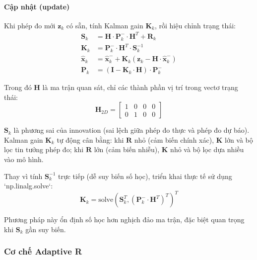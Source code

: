 \paragraph{Cập nhật (update)\\} Khi phép đo mới $\mathbf{z}_k$ có sẵn, tính Kalman gain $\mathbf{K}_k$, rồi hiệu chỉnh trạng thái:
\begin{equation}
\begin{aligned}
    \mathbf{S}_k &= \mathbf{H} \cdot \mathbf{P}_k^- \cdot \mathbf{H}^T + \mathbf{R}_k \\
    \mathbf{K}_k &= \mathbf{P}_k^- \cdot \mathbf{H}^T \cdot \mathbf{S}_k^{-1} \\
    \hat{\mathbf{x}}_k &= \hat{\mathbf{x}}_k^- + \mathbf{K}_k \left(\mathbf{z}_k - \mathbf{H} \cdot \hat{\mathbf{x}}_k^-\right) \\
    \mathbf{P}_k &= \left(\mathbf{I} - \mathbf{K}_k \cdot \mathbf{H}\right) \cdot \mathbf{P}_k^-
\end{aligned}
\end{equation}

Trong đó $\mathbf{H}$ là ma trận quan sát, chỉ các thành phần vị trí trong vectơ trạng thái:
\begin{equation}
    \mathbf{H}_{2D} = \begin{bmatrix} 1 & 0 & 0 & 0 \\ 0 & 1 & 0 & 0 \end{bmatrix}
\end{equation}

$\mathbf{S}_k$ là phương sai của innovation (sai lệch giữa phép đo thực và phép đo dự báo). Kalman gain $\mathbf{K}_k$ tự động cân bằng: khi $\mathbf{R}$ nhỏ (cảm biến chính xác), $\mathbf{K}$ lớn và bộ lọc tin tưởng phép đo; khi $\mathbf{R}$ lớn (cảm biến nhiễu), $\mathbf{K}$ nhỏ và bộ lọc dựa nhiều vào mô hình.

Thay vì tính $\mathbf{S}_k^{-1}$ trực tiếp (dễ suy biến số học), triển khai thực tế sử dụng `np.linalg.solve`:
\begin{equation}
    \mathbf{K}_k = \text{solve}\left(\mathbf{S}_k^T, \left(\mathbf{P}_k^- \cdot \mathbf{H}^T\right)^T\right)^T
\end{equation}

Phương pháp này ổn định số học hơn nghịch đảo ma trận, đặc biệt quan trọng khi $\mathbf{S}_k$ gần suy biến.

\subsubsection{Cơ chế Adaptive R}

